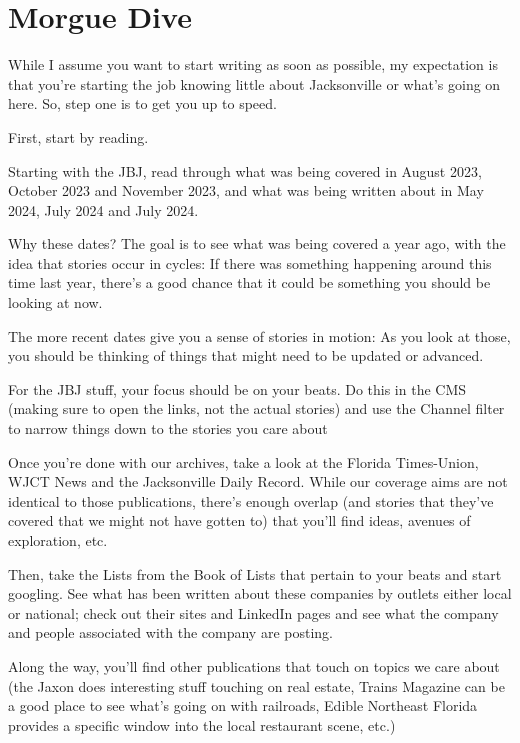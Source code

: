 \documentclass[
  11pt,
  american,
  letterpaperpaper,
  extrafontsizes,onecolumn,openright
  ]{memoir}
\begin{document}
\hypertarget{morgue-dive}{%
\section*{Morgue Dive}\label{morgue-dive}}

While I assume you want to start writing as soon as possible, my expectation is that you're starting the job knowing little about Jacksonville or what's going on here. So, step one is to get you up to speed.

First, start by reading.

Starting with the JBJ, read through what was being covered in August 2023, October 2023 and November 2023, and what was being written about in May 2024, July 2024 and July 2024.

Why these dates? The goal is to see what was being covered a year ago, with the idea that stories occur in cycles: If there was something happening around this time last year, there's a good chance that it could be something you should be looking at now.

The more recent dates give you a sense of stories in motion: As you look at those, you should be thinking of things that might need to be updated or advanced.

For the JBJ stuff, your focus should be on your beats. Do this in the CMS (making sure to open the links, not the actual stories) and use the Channel filter to narrow things down to the stories you care about

Once you're done with our archives, take a look at the Florida Times-Union, WJCT News and the Jacksonville Daily Record. While our coverage aims are not identical to those publications, there's enough overlap (and stories that they've covered that we might not have gotten to) that you'll find ideas, avenues of exploration, etc.

Then, take the Lists from the Book of Lists that pertain to your beats and start googling. See what has been written about these companies by outlets either local or national; check out their sites and LinkedIn pages and see what the company and people associated with the company are posting.

Along the way, you'll find other publications that touch on topics we care about (the Jaxon does interesting stuff touching on real estate, Trains Magazine can be a good place to see what's going on with railroads, Edible Northeast Florida provides a specific window into the local restaurant scene, etc.)
\end{document}
